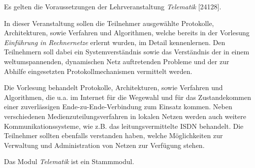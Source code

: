 \begin{module}
\begin{styleenv}
\begin{conditions}Es gelten die Voraussetzungen der Lehrveranstaltung \emph{Telematik} [24128].

\end{conditions}


\end{styleenv}

\begin{learningoutcomes}
In dieser Veranstaltung sollen die Teilnehmer ausgewählte Protokolle, Architekturen, sowie Verfahren und Algorithmen, welche bereits in der Vorlesung \emph{Einführung in Rechnernetze} erlernt wurden, im Detail kennenlernen. Den Teilnehmern soll dabei ein Systemverständnis sowie das Verständnis der in einem weltumspannenden, dynamischen Netz auftretenden Probleme und der zur Abhilfe eingesetzten Protokollmechanismen vermittelt werden.


\end{learningoutcomes}

\begin{content}
Die Vorlesung behandelt Protokolle, Architekturen, sowie Verfahren und Algorithmen, die u.a. im Internet für die Wegewahl und für das Zustandekommen einer zuverlässigen Ende-zu-Ende-Verbindung zum Einsatz kommen. Neben verschiedenen Medienzuteilungsverfahren in lokalen Netzen werden auch weitere Kommunikationssysteme, wie z.B. das leitungsvermittelte ISDN behandelt. Die Teilnehmer sollten ebenfalls verstanden haben, welche Möglichkeiten zur Verwaltung und Administration von Netzen zur Verfügung stehen.


\end{content}

\begin{remarks}Das Modul \emph{Telematik} ist ein Stammmodul.

\end{remarks}

\end{module}

